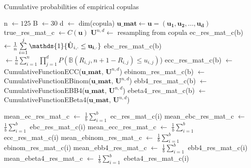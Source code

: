 \documentclass[12pt]{report}
\newcommand{\1}{\mathbf{1}}
\begin{document}
\begin{flushleft}
\begin{algorithm}[H]
\caption{Cumulative probabilities of empirical copulas}
\begin{algorithmic}
 
    \State n $\gets 125$
    \State B $\gets 30$
    \State d $\gets$ dim(copula)
    \State $\mathbf{u\_mat} \gets \mathbf{u} = (\mathbf{u_{1}}, \mathbf{u_{2}}, \dots, \mathbf{u_{d}})$ 
    \State true\_res\_mat\_c $\gets C(\textbf{u})$ 
        \State $\textbf{U}^{n,d} \gets$ resampling from copula 
        \State ec\_res\_mat\_c(b) $\gets \frac{1}{n} \sum\limits_{i = 1}^{j} \mathds{1}\{\Hat{\mathbf{U}}_{i,\cdot} \le \mathbf{u_{i,\cdot}}\}$ 
        \State ebc\_res\_mat\_c(b) $\gets \frac{1}{n}\sum\limits_{i = 1}^{n} \prod\limits_{j = 1}^{d} P(\mathbb{B}(R_{i,j}, n + 1 - R_{i,j}) \le u_{i,j})$)
        \State ecc\_res\_mat\_c(b) $\gets$ CumulativeFunctionECC($\mathbf{u\_mat}$, $\textbf{U}^{n,d}$)
        \State ebinom\_res\_mat\_c(b) $\gets$ CumulativeFunctionEBinom($\mathbf{u\_mat}$, $\textbf{U}^{n,d}$)
        \State ebb4\_res\_mat\_c(b) $\gets$ CumulativeFunctionEBB4($\mathbf{u\_mat}$, $\textbf{U}^{n,d}$)
        \State ebeta4\_res\_mat\_c(b) $\gets$ CumulativeFunctionEBeta4($\mathbf{u\_mat}$, $\textbf{U}^{n,d}$)

    \EndFor
    \State mean\_ec\_res\_mat\_c $\gets$ $\frac{1}{b}\sum\limits_{i = 1}^{b}$ ec\_res\_mat\_c(i)
    \State mean\_ebc\_res\_mat\_c $\gets$ $\frac{1}{b}\sum\limits_{i = 1}^{b}$ ebc\_res\_mat\_c(i)
    \State mean\_ecc\_res\_mat\_c $\gets$ $\frac{1}{b}\sum\limits_{i = 1}^{b}$ ecc\_res\_mat\_c(i)
    \State mean\_ebinom\_res\_mat\_c $\gets$ $\frac{1}{b}\sum\limits_{i = 1}^{b}$ ebinom\_res\_mat\_c(i)
    \State mean\_ebb4\_res\_mat\_c $\gets$ $\frac{1}{b}\sum\limits_{i = 1}^{b}$ ebb4\_res\_mat\_c(i)
    \State mean\_ebeta4\_res\_mat\_c $\gets$ $\frac{1}{b}\sum\limits_{i = 1}^{b}$ ebeta4\_res\_mat\_c(i)


\end{algorithmic}
\end{algorithm}
\end{flushleft}
\end{document}
